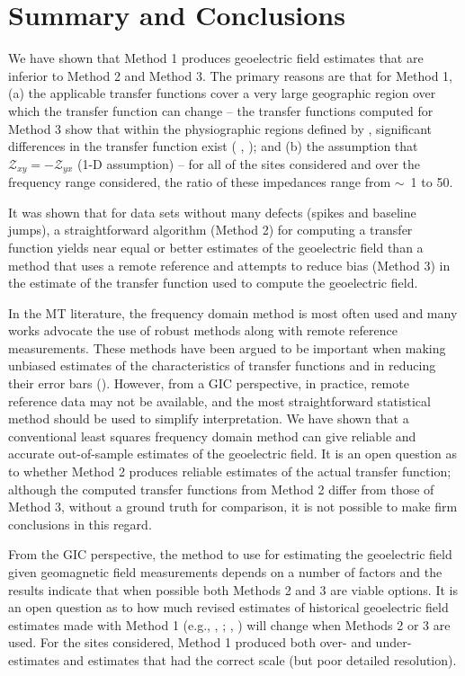 \documentclass[12pt]{article}
\newcommand{\citeay}[1]{%
\citeauthor{#1}, \citeyear{#1}%
}
\begin{document}
\section{Summary and Conclusions}

We have shown that Method 1 produces geoelectric field estimates that are inferior to Method 2 and Method 3.  The primary reasons are that for Method 1, (a) the applicable transfer functions cover a very large geographic region over which the transfer function can change -- the transfer functions computed for Method 3 show that within the physiographic regions defined by \cite{Fernberg2012}, significant differences in the transfer function exist (\citeay{Bedrosian2015}); and (b) the assumption that $\mathcal{Z}_{xy}=-\mathcal{Z}_{yx}$ (1-D assumption) -- for all of the sites considered and over the frequency range considered, the ratio of these impedances range from $\sim$~1 to 50.

It was shown that for data sets without many defects (spikes and baseline jumps), a straightforward algorithm (Method 2) for computing a transfer function yields near equal or better estimates of the geoelectric field than a method that uses a remote reference and attempts to reduce bias (Method 3) in the estimate of the transfer function used to compute the geoelectric field.

In the MT literature, the frequency domain method is most often used and many works advocate the use of robust methods along with remote reference measurements.  These methods have been argued to be important when making unbiased estimates of the characteristics of transfer functions and in reducing their error bars (\cite{Chave2012}).  However, from a GIC perspective, in practice, remote reference data may not be available, and the most straightforward statistical method should be used to simplify interpretation.  We have shown that a conventional least squares frequency domain method can give reliable and accurate out-of-sample estimates of the geoelectric field.  It is an open question as to whether Method 2 produces reliable estimates of the actual transfer function; although the computed transfer functions from Method 2 differ from those of Method 3, without a ground truth for comparison, it is not possible to make firm conclusions in this regard.

From the GIC perspective, the method to use for estimating the geoelectric field given geomagnetic field measurements depends on a number of factors and the results indicate that when possible both Methods 2 and 3 are viable options.  It is an open question as to how much revised estimates of historical geoelectric field estimates made with Method 1 (e.g., \citeay{Pulkkinen2012}; \citeay{Wei2013}) will change when Methods 2 or 3 are used.  For the sites considered, Method 1 produced both over- and under-estimates and estimates that had the correct scale (but poor detailed resolution).
\end{document}
